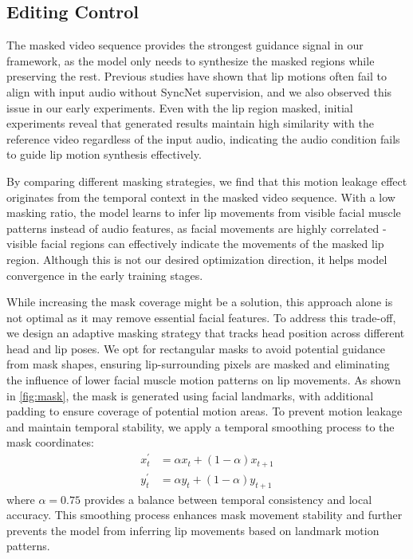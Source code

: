 \subsection{Editing Control}

The masked video sequence provides the strongest guidance signal in our framework, as the model only needs to synthesize the masked regions while preserving the rest. Previous studies \citep{mukhopadhyay2024diff2lip, yaman2023plug} have shown that lip motions often fail to align with input audio without SyncNet supervision, and we also observed this issue in our early experiments. Even with the lip region masked, initial experiments reveal that generated results maintain high similarity with the reference video regardless of the input audio, indicating the audio condition fails to guide lip motion synthesis effectively.

By comparing different masking strategies, we find that this motion leakage effect originates from the temporal context in the masked video sequence. With a low masking ratio, the model learns to infer lip movements from visible facial muscle patterns instead of audio features, as facial movements are highly correlated - visible facial regions can effectively indicate the movements of the masked lip region. Although this is not our desired optimization direction, it helps model convergence in the early training stages.

% 
While increasing the mask coverage might be a solution, this approach alone is not optimal as it may remove essential facial features. To address this trade-off, we design an adaptive masking strategy that tracks head position across different head and lip poses. We opt for rectangular masks to avoid potential guidance from mask shapes, ensuring lip-surrounding pixels are masked and eliminating the influence of lower facial muscle motion patterns on lip movements. As shown in \cref{fig:mask}, the mask is generated using facial landmarks, with additional padding to ensure coverage of potential motion areas. To prevent motion leakage and maintain temporal stability, we apply a temporal smoothing process to the mask coordinates:
\begin{equation}
\begin{split}
x_t^{\prime} &= \alpha x_t + (1-\alpha)x_{t+1} \\
y_t^{\prime} &= \alpha y_t + (1-\alpha)y_{t+1}
\end{split}
\end{equation}
where $\alpha=0.75$ provides a balance between temporal consistency and local accuracy. This smoothing process enhances mask movement stability and further prevents the model from inferring lip movements based on landmark motion patterns.


